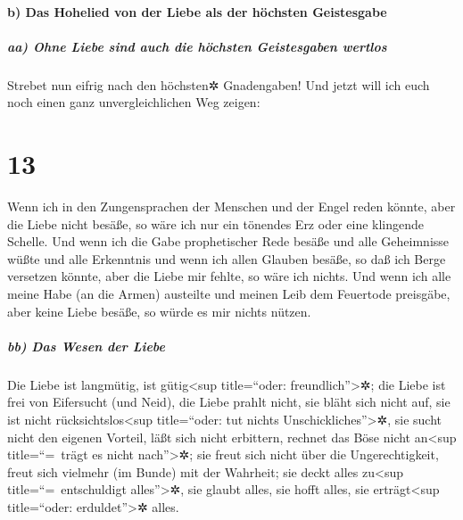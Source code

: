 \hypertarget{b-das-hohelied-von-der-liebe-als-der-huxf6chsten-geistesgabe}{%
\paragraph{b) Das Hohelied von der Liebe als der höchsten
Geistesgabe}\label{b-das-hohelied-von-der-liebe-als-der-huxf6chsten-geistesgabe}}

\hypertarget{aa-ohne-liebe-sind-auch-die-huxf6chsten-geistesgaben-wertlos}{%
\subparagraph{aa) Ohne Liebe sind auch die höchsten Geistesgaben
wertlos}\label{aa-ohne-liebe-sind-auch-die-huxf6chsten-geistesgaben-wertlos}}

 Strebet nun eifrig nach den höchsten✲ Gnadengaben! Und
jetzt will ich euch noch einen ganz unvergleichlichen Weg zeigen:

\hypertarget{section-12}{%
\section{13}\label{section-12}}

 Wenn ich in den Zungensprachen der Menschen und der Engel
reden könnte, aber die Liebe nicht besäße, so wäre ich nur ein tönendes
Erz oder eine klingende Schelle.  Und wenn ich die Gabe
prophetischer Rede besäße und alle Geheimnisse wüßte und alle Erkenntnis
und wenn ich allen Glauben besäße, so daß ich Berge versetzen könnte,
aber die Liebe mir fehlte, so wäre ich nichts.  Und wenn
ich alle meine Habe (an die Armen) austeilte und meinen Leib dem
Feuertode preisgäbe, aber keine Liebe besäße, so würde es mir nichts
nützen.

\hypertarget{bb-das-wesen-der-liebe}{%
\subparagraph{bb) Das Wesen der Liebe}\label{bb-das-wesen-der-liebe}}

 Die Liebe ist langmütig, ist gütig\textless sup
title=``oder: freundlich''\textgreater✲; die Liebe ist frei von
Eifersucht (und Neid), die Liebe prahlt nicht, sie bläht sich nicht auf,
 sie ist nicht rücksichtslos\textless sup title=``oder:
tut nichts Unschickliches''\textgreater✲, sie sucht nicht den eigenen
Vorteil, läßt sich nicht erbittern, rechnet das Böse nicht
an\textless sup title=``=~trägt es nicht nach''\textgreater✲;
 sie freut sich nicht über die Ungerechtigkeit, freut sich
vielmehr (im Bunde) mit der Wahrheit;  sie deckt alles
zu\textless sup title=``=~entschuldigt alles''\textgreater✲, sie glaubt
alles, sie hofft alles, sie erträgt\textless sup title=``oder:
erduldet''\textgreater✲ alles.

